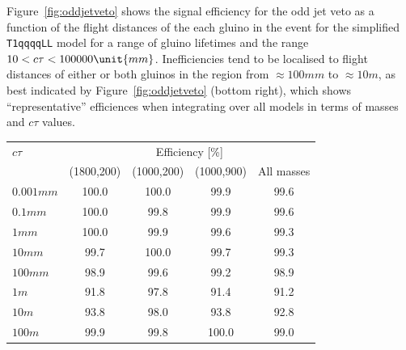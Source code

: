 Figure~\ref{fig:oddjetveto} shows the signal efficiency for the odd
jet veto as a function of the flight distances of the each gluino in
the event for the simplified \texttt{T1qqqqLL} model for a range of
gluino lifetimes and the range $10 < \ctau <
100000\unit{mm}$. Inefficiencies tend to be localised to flight
distances of either or both gluinos in the region from
${\approx}100\unit{mm}$ to ${\approx}10\unit{m}$, as best indicated by
Figure~\ref{fig:oddjetveto} (bottom right), which shows
``representative'' efficiences when integrating over all models in
terms of masses and $c\tau$ values.

\begin{table}[h!]
\centering
  \begin{tabular}{lcccc} 
    \hline
    $c\tau$          & \multicolumn{4}{c}{Efficiency [\%]}               \\
    \cline{2-5}
                     & (1800,200) & (1000,200) & (1000,900) & All masses \\
    \hline
    $0.001\unit{mm}$ & 100.0      & 100.0      & 99.9       & 99.6       \\
    $0.1\unit{mm}$   & 100.0      & 99.8       & 99.9       & 99.6       \\
    $1\unit{mm}$     & 100.0      & 99.9       & 99.6       & 99.3       \\
    $10\unit{mm}$    & 99.7       & 100.0      & 99.7       & 99.3       \\
    $100\unit{mm}$   & 98.9       & 99.6       & 99.2       & 98.9       \\
    $1\unit{m}$      & 91.8       & 97.8       & 91.4       & 91.2       \\
    $10\unit{m}$     & 93.8       & 98.0       & 93.8       & 92.8       \\
    $100\unit{m}$    & 99.9       & 99.8       & 100.0      & 99.0       \\
    \hline
  \end{tabular}
  \label{tab:LLP-oddjetveto}
\end{table}

